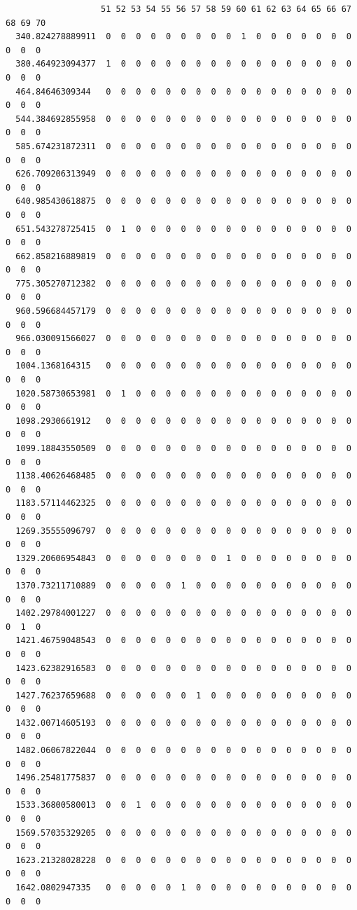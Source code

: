 \documentclass[
  letterpaper,
  DIV=11,
  numbers=noendperiod]{scrartcl}
\begin{document}
\begin{verbatim}
                   51 52 53 54 55 56 57 58 59 60 61 62 63 64 65 66 67 68 69 70
  340.824278889911  0  0  0  0  0  0  0  0  0  1  0  0  0  0  0  0  0  0  0  0
  380.464923094377  1  0  0  0  0  0  0  0  0  0  0  0  0  0  0  0  0  0  0  0
  464.84646309344   0  0  0  0  0  0  0  0  0  0  0  0  0  0  0  0  0  0  0  0
  544.384692855958  0  0  0  0  0  0  0  0  0  0  0  0  0  0  0  0  0  0  0  0
  585.674231872311  0  0  0  0  0  0  0  0  0  0  0  0  0  0  0  0  0  0  0  0
  626.709206313949  0  0  0  0  0  0  0  0  0  0  0  0  0  0  0  0  0  0  0  0
  640.985430618875  0  0  0  0  0  0  0  0  0  0  0  0  0  0  0  0  0  0  0  0
  651.543278725415  0  1  0  0  0  0  0  0  0  0  0  0  0  0  0  0  0  0  0  0
  662.858216889819  0  0  0  0  0  0  0  0  0  0  0  0  0  0  0  0  0  0  0  0
  775.305270712382  0  0  0  0  0  0  0  0  0  0  0  0  0  0  0  0  0  0  0  0
  960.596684457179  0  0  0  0  0  0  0  0  0  0  0  0  0  0  0  0  0  0  0  0
  966.030091566027  0  0  0  0  0  0  0  0  0  0  0  0  0  0  0  0  0  0  0  0
  1004.1368164315   0  0  0  0  0  0  0  0  0  0  0  0  0  0  0  0  0  0  0  0
  1020.58730653981  0  1  0  0  0  0  0  0  0  0  0  0  0  0  0  0  0  0  0  0
  1098.2930661912   0  0  0  0  0  0  0  0  0  0  0  0  0  0  0  0  0  0  0  0
  1099.18843550509  0  0  0  0  0  0  0  0  0  0  0  0  0  0  0  0  0  0  0  0
  1138.40626468485  0  0  0  0  0  0  0  0  0  0  0  0  0  0  0  0  0  0  0  0
  1183.57114462325  0  0  0  0  0  0  0  0  0  0  0  0  0  0  0  0  0  0  0  0
  1269.35555096797  0  0  0  0  0  0  0  0  0  0  0  0  0  0  0  0  0  0  0  0
  1329.20606954843  0  0  0  0  0  0  0  0  1  0  0  0  0  0  0  0  0  0  0  0
  1370.73211710889  0  0  0  0  0  1  0  0  0  0  0  0  0  0  0  0  0  0  0  0
  1402.29784001227  0  0  0  0  0  0  0  0  0  0  0  0  0  0  0  0  0  0  1  0
  1421.46759048543  0  0  0  0  0  0  0  0  0  0  0  0  0  0  0  0  0  0  0  0
  1423.62382916583  0  0  0  0  0  0  0  0  0  0  0  0  0  0  0  0  0  0  0  0
  1427.76237659688  0  0  0  0  0  0  1  0  0  0  0  0  0  0  0  0  0  0  0  0
  1432.00714605193  0  0  0  0  0  0  0  0  0  0  0  0  0  0  0  0  0  0  0  0
  1482.06067822044  0  0  0  0  0  0  0  0  0  0  0  0  0  0  0  0  0  0  0  0
  1496.25481775837  0  0  0  0  0  0  0  0  0  0  0  0  0  0  0  0  0  0  0  0
  1533.36800580013  0  0  1  0  0  0  0  0  0  0  0  0  0  0  0  0  0  0  0  0
  1569.57035329205  0  0  0  0  0  0  0  0  0  0  0  0  0  0  0  0  0  0  0  0
  1623.21328028228  0  0  0  0  0  0  0  0  0  0  0  0  0  0  0  0  0  0  0  0
  1642.0802947335   0  0  0  0  0  1  0  0  0  0  0  0  0  0  0  0  0  0  0  0

\end{verbatim}
\end{document}
